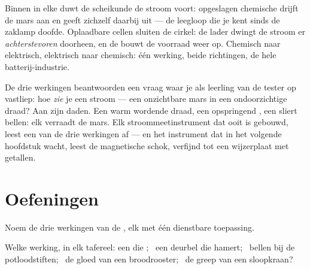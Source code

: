 \begin{example}\label{ex:g8:electric-current-effects:battery}
Binnen in elke  duwt de scheikunde de stroom voort:
opgeslagen chemische  drijft de mars aan en geeft zichzelf
daarbij uit --- de leegloop die je kent sinds de zaklamp doofde.
Oplaadbare cellen sluiten de cirkel: de lader dwingt de stroom er
\emph{achterstevoren} doorheen, en de  bouwt de
voorraad weer op. Chemisch naar elektrisch, elektrisch naar chemisch:
één werking, beide richtingen, de hele batterij-industrie.
\end{example}

\begin{remark}\label{rem:g8:electric-current-effects:detect}
De drie werkingen beantwoorden een vraag waar je als leerling van de
tester op vastliep: hoe \emph{zie} je een stroom --- een onzichtbare
mars in een ondoorzichtige draad? Aan zijn daden. Een warm
wordende draad, een opspringend , een sliert bellen: elk
verraadt de mars. Elk stroommeetinstrument dat ooit is gebouwd, leest
een van de drie werkingen af --- en het instrument dat in het volgende
hoofdstuk wacht, leest de magnetische schok, verfijnd tot een wijzerplaat
met getallen.
\end{remark}

\section{Oefeningen}

\begin{exercise}[$\star$]\label{exo:g8:electric-current-effects:1}
Noem de drie werkingen van de , elk met één
dienstbare toepassing.
\end{exercise}

\begin{exercise}[$\star$]\label{exo:g8:electric-current-effects:2}
Welke werking, in elk tafereel: een  die
; \ een deurbel die hamert; \ bellen bij de potloodstiften;
\ de gloed van een broodrooster; \ de greep van een sloopkraan?
\end{exercise}

